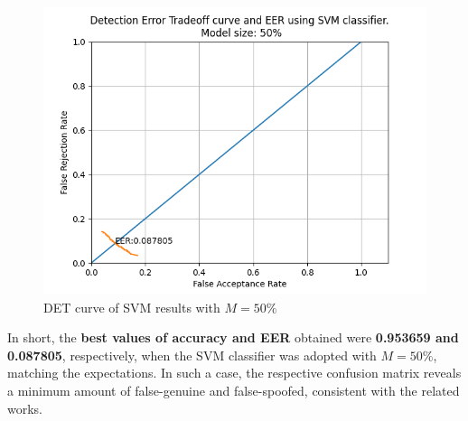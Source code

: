 \begin{figure}[H]
\centering
\includegraphics[scale=.6]{images/results/det/DET_SVM_50}
\caption{DET curve of SVM results with $M=50\%$}
\label{fig:detsvm50}
\end{figure}
\par In short, the \textbf{best values of accuracy and EER} obtained were \textbf{0.953659 and 0.087805}, respectively, when the SVM classifier was adopted with $M=50\%$, matching the expectations. In such a case, the respective confusion matrix reveals a minimum amount of false-genuine and false-spoofed, consistent with the related works.
